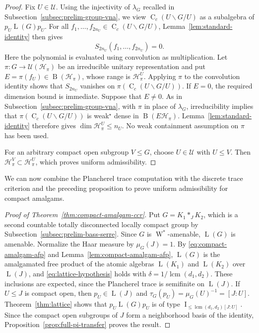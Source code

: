\documentclass[11pt]{amsart}
\numberwithin{equation}{section}
\renewcommand{\H}{\mathcal H}
\newcommand{\U}{\mathcal U}
\DeclareMathOperator{\LL}{L}
\DeclareMathOperator{\I}{I}
\DeclareMathOperator{\lcm}{lcm}
\newcommand{\Wstar}{\operatorname{W}^*}
\newcommand{\rB}{\operatorname{B}}
\newcommand{\rC}{\operatorname{C}}
\newcommand{\Hk}[2]{\rC_c(#2\backslash #1/#2)}
\theoremstyle{definition}
\begin{document}
\begin{proof}
    Fix $U\in\U$. Using the injectivity of $\lambda_G$ recalled in Subsection~\ref{subsec:prelim-group-vna}, we view $\Hk GU$ as a subalgebra of $p_U\LL(G)p_U$. For all $f_1,\ldots,f_{2n_U}\in\Hk GU$, Lemma~\ref{lem:standard-identity} then gives
    $$
        S_{2n_U}(f_1,\ldots,f_{2n_U})=0.
    $$
    Here the polynomial is evaluated using convolution as multiplication. Let $\pi:G\to\U(\H_\pi)$ be an irreducible unitary representation and put $E=\pi(f_U)\in\rB(\H_\pi)$, whose range is $\H_\pi^U$. Applying $\pi$ to the convolution identity shows that $S_{2n_U}$ vanishes on $\pi(\Hk GU)$. If $E=0$, the required dimension bound is immediate. Suppose that $E\ne0$. As in Subsection~\ref{subsec:prelim-group-vna}, with $\pi$ in place of $\lambda_G$, irreducibility implies that $\pi(\Hk GU)$ is weak$^\star$ dense in $\rB(E\H_\pi)$. Lemma~\ref{lem:standard-identity} therefore gives $\dim\H_\pi^U\leq n_U$. No weak containment assumption on $\pi$ has been used.

    For an arbitrary compact open subgroup $V\leq G$, choose $U\in\U$ with $U\leq V$. Then $\H_\pi^V\subset\H_\pi^U$, which proves uniform admissibility.
\end{proof}

We can now combine the Plancherel trace computation with the discrete trace criterion and the preceding proposition to prove uniform admissibility for compact amalgams.

\begin{proof}[Proof of Theorem~\ref{thm:compact-amalgam-ccr}]
    Put $G=K_1\ast_JK_2$, which is a second countable totally disconnected locally compact group by Subsection~\ref{subsec:prelim-bass-serre}. Since $G$ is $\Wstar$-amenable, $\LL(G)$ is amenable. Normalize the Haar measure by $\mu_G(J)=1$. By \eqref{eq:compact-amalgam-afp} and Lemma~\ref{lem:compact-amalgam-afp}, $\LL(G)$ is the amalgamated free product of the atomic algebras $\LL(K_1)$ and $\LL(K_2)$ over $\LL(J)$, and \eqref{eq:lattice-hypothesis} holds with $\delta=1/\lcm(d_1,d_2)$. These inclusions are expected, since the Plancherel trace is semifinite on $\LL(J)$. If $U\leq J$ is compact open, then $p_U\in\LL(J)$ and $\tau_G(p_U)=\mu_G(U)^{-1}=[J:U]$. Theorem~\ref{thm:lattice} shows that $p_U\LL(G)p_U$ is of type $\I_{\leq\lcm(d_1,d_2)[J:U]}$. Since the compact open subgroups of $J$ form a neighborhood basis of the identity, Proposition~\ref{prop:full-pi-transfer} proves the result.
\end{proof}
\end{document}
